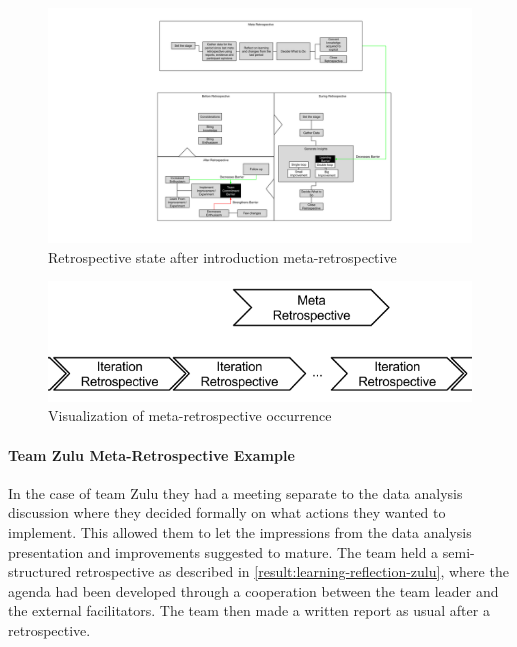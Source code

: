 \begin{figure}
	\centering
	\includegraphics[width=\textwidth, keepaspectratio]{figures/meta-retro.png}
	\caption{Retrospective state after introduction meta-retrospective}
	\label{figure:retro-meta-state}
\end{figure}

\begin{figure}[!h]
	\centering
	\includegraphics[width=\textwidth, keepaspectratio]{figures/meta-retro-occurence.png}
	\caption{Visualization of meta-retrospective occurrence}
	\label{figure:retro-meta-occurence}
\end{figure}
\afterpage{\clearpage}

\paragraph{Team Zulu Meta-Retrospective Example}
In the case of team Zulu they had a meeting separate to the data analysis discussion where they decided formally on what actions they wanted to implement. This allowed them to let the impressions from the data analysis presentation and improvements suggested to mature. The team held a semi-structured retrospective as described in \autoref{result:learning-reflection-zulu}, where the agenda had been developed through a cooperation between the team leader and the external facilitators. The team then made a written report as usual after a retrospective.

